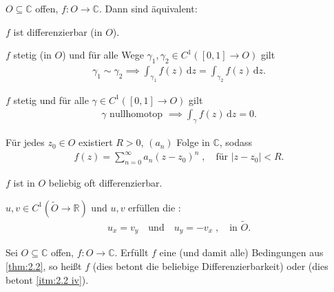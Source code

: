 \begin{theorem}[Satz] \label{thm:2.2}
  $O \subseteq \mathbb{C}$ offen, $f : O \to \mathbb{C}$. Dann sind äquivalent:
  \begin{enum-roman}
    \item \label{itm:2.2 i} $f$ ist differenzierbar (in $O$).
    
    \item \label{itm:2.2 ii} $f$ stetig (in $O$) und für alle Wege $\gamma_1, \gamma_2 \in C^1([0,1] \to O)$ gilt
    \begin{align*}
      \gamma_1 \sim \gamma_2 \implies \int_{\gamma_1} f(z) \, \mathrm{d}z = \int_{\gamma_2} f(z) \, \mathrm{d}z.
    \end{align*}
    
    \item \label{itm:2.2 iii} $f$ stetig und für alle $\gamma \in C^1([0,1] \to O)$ gilt
    \begin{align*}
      \gamma \text{ nullhomotop } \implies \int_\gamma f(z) \, \mathrm{d}z = 0.
    \end{align*}
    
    \item \label{itm:2.2 iv} Für jedes $z_0 \in O$ existiert $R > 0$, $(a_n)$ Folge in $\mathbb{C}$, sodass
    \begin{align*}
      f(z) = \sum\limits_{n=0}^{\infty} a_n (z-z_0)^n \; , \quad \text{für } |z-z_0| < R.
    \end{align*}
    
    \item \label{itm:2.2 v} $f$ ist in $O$ beliebig oft differenzierbar.
    
    \item \label{itm:2.2 vi} $u, v \in C^1(\widetilde{O} \to \mathbb{R})$ und $u, v$ erfüllen die :
    \begin{align*}
      u_x = v_y \quad \text{und} \quad u_y = -v_x \; , \quad \text{in } \widetilde{O}.
    \end{align*}
  \end{enum-roman}
\end{theorem}

\begin{theorem}[Definition]
  Sei $O \subseteq \mathbb{C}$ offen, $f : O \to \mathbb{C}$. Erfüllt $f$ eine (und damit alle) Bedingungen aus \ref{thm:2.2}, so heißt $f$  (dies betont die beliebige Differenzierbarkeit) oder  (dies betont \ref{itm:2.2 iv}).
\end{theorem}

